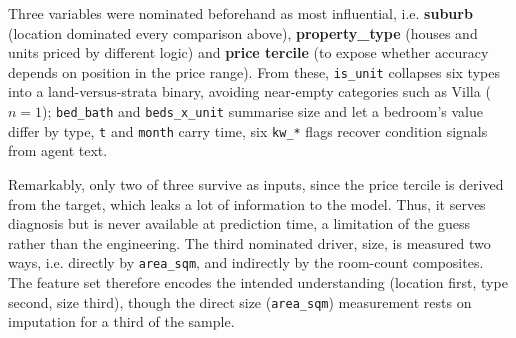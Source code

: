 Three variables were nominated beforehand as most influential, i.e. \textbf{suburb}
(location dominated every comparison above), \textbf{property\_type} (houses and units
priced by different logic) and \textbf{price tercile} (to expose whether accuracy
depends on position in the price range). From these, \texttt{is\_unit} collapses six
types into a land-versus-strata binary, avoiding near-empty categories such as Villa
($n=1$); \texttt{bed\_bath} and \texttt{beds\_x\_unit} summarise size and let a
bedroom's value differ by type, \texttt{t} and \texttt{month} carry time, six
\texttt{kw\_*} flags recover condition signals from agent text.

Remarkably, only two of three survive as inputs, since the price tercile is derived from the target, which leaks a lot of information to the model.
Thus, it serves diagnosis but is never available at prediction time, a limitation of the guess rather than the engineering.
The third nominated driver, size, is measured two ways, i.e. directly by \texttt{area\_sqm}, and indirectly by the room-count composites.
The feature set therefore encodes the intended understanding (location first, type second, size third), though the direct size (\texttt{area\_sqm}) measurement rests on imputation for a third of the sample.
